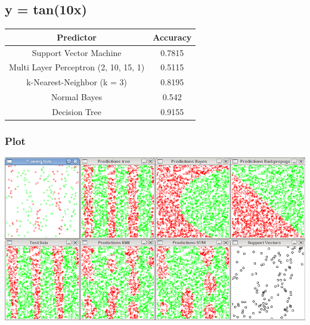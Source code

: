 \subsection{y = tan(10x)}

\begin{center}
\begin{tabular}{|c|c|}
\hline
Predictor &	Accuracy\\ \hline\hline
Support Vector Machine & 0.7815\\ \hline
Multi Layer Perceptron (2, 10, 15, 1) &	0.5115\\ \hline
k-Nearest-Neighbor (k = 3) & 0.8195\\ \hline
Normal Bayes &	0.542\\ \hline
Decision Tree &	0.9155\\ \hline
\end{tabular}
\end{center}

\subsubsection{Plot}
\begin{center}
 \includegraphics[scale=0.4]{img/eval/tan10x.png}
\end{center}
